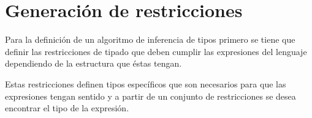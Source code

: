 \documentclass[12pt]{extarticle}
\begin{document}



\section{Generación de restricciones}
Para la definición de un algoritmo de inferencia de tipos primero se tiene que definir las restricciones de tipado que deben cumplir las expresiones del lenguaje dependiendo de la estructura que éstas tengan.

Estas restricciones definen tipos específicos que son necesarios para que las expresiones tengan sentido y a partir de un conjunto de restricciones se desea encontrar el tipo de la expresión.
\end{document}
